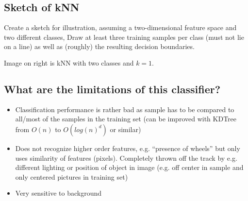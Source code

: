 \subsection{Sketch of kNN}
\begin{minipage}{0.65\textwidth}
{Create a sketch for illustration, assuming a two-dimensional feature space and two different classes, Draw at least three training samples per class (must not lie on a line) as well as (roughly) the resulting decision boundaries.}

Image on right is kNN with two classes and $k=1$.
\end{minipage}
\begin{minipage}{0.4\textwidth}

\end{minipage}
\subsection{What are the limitations of this classifier?}
\begin{itemize}
\item Classification performance is rather bad as sample has to be compared to all/most of the samples in the training set (can be improved with KDTree from $O(n)$ to $O(log(n)^d)$ or similar)
\item Does not recognize higher order features, e.g. ``presence of wheels'' but only uses similarity of features (pixels). Completely thrown off the track by e.g. different lighting or position of object in image (e.g. off center in sample and only centered pictures in training set)
\item Very sensitive to background
\end{itemize}
%
